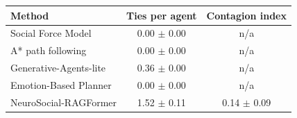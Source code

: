 \begin{tabular}{lcc}\toprule
Method & Ties per agent & Contagion index \\ \midrule
Social Force Model & 0.00 $\pm$ 0.00 & n/a \\
A* path following & 0.00 $\pm$ 0.00 & n/a \\
Generative-Agents-lite & 0.36 $\pm$ 0.00 & n/a \\
Emotion-Based Planner & 0.00 $\pm$ 0.00 & n/a \\
NeuroSocial-RAGFormer & 1.52 $\pm$ 0.11 & 0.14 $\pm$ 0.09 \\
\bottomrule\end{tabular}